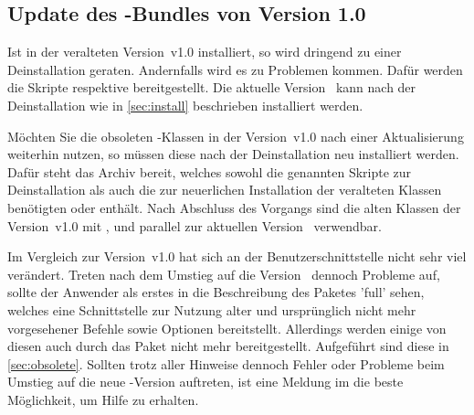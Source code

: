 \subsection{Update des \TUDScript-Bundles von Version 1.0}
\begin{Declaration*}{}
\begin{Declaration*}{}
\begin{Declaration*}{}
%
%
%
Ist \TUDScript in der veralteten Version~v1.0 installiert, so wird dringend zu 
einer Deinstallation geraten. Andernfalls wird es zu Problemen kommen. Dafür 
werden die Skripte 
respektive
bereitgestellt. Die aktuelle Version~\vTUDScript{} kann nach der Deinstallation 
wie in \autoref{sec:install} beschrieben installiert werden.

Möchten Sie die obsoleten \TUDScript-Klassen in der Version~v1.0 nach einer 
Aktualisierung weiterhin nutzen, so müssen diese nach der Deinstallation neu 
installiert werden. Dafür steht das Archiv 
%
{} bereit, welches sowohl die genannten 
Skripte zur Deinstallation als auch die zur neuerlichen Installation der 
veralteten Klassen benötigten  oder 
 enthält. Nach Abschluss des Vorgangs sind 
die alten Klassen der Version~v1.0 mit , 
 und  parallel zur aktuellen 
Version~\vTUDScript{} verwendbar.

Im Vergleich zur Version~v1.0 hat sich an der Benutzerschnittstelle nicht sehr 
viel verändert. Treten nach dem Umstieg auf die Version~\vTUDScript{} dennoch 
Probleme auf, sollte der Anwender als erstes in die Beschreibung des Paketes 
'full' sehen, welches eine Schnittstelle zur Nutzung alter 
und ursprünglich nicht mehr vorgesehener Befehle sowie Optionen bereitstellt. 
Allerdings werden einige von diesen auch durch das Paket  
nicht mehr bereitgestellt. Aufgeführt sind diese in \autoref{sec:obsolete}. 
Sollten trotz aller Hinweise dennoch Fehler oder Probleme beim Umstieg auf 
die neue \TUDScript-Version auftreten, ist eine Meldung im \Forum die beste 
Möglichkeit, um Hilfe zu erhalten.
\end{Declaration*}
\end{Declaration*}
\end{Declaration*}


